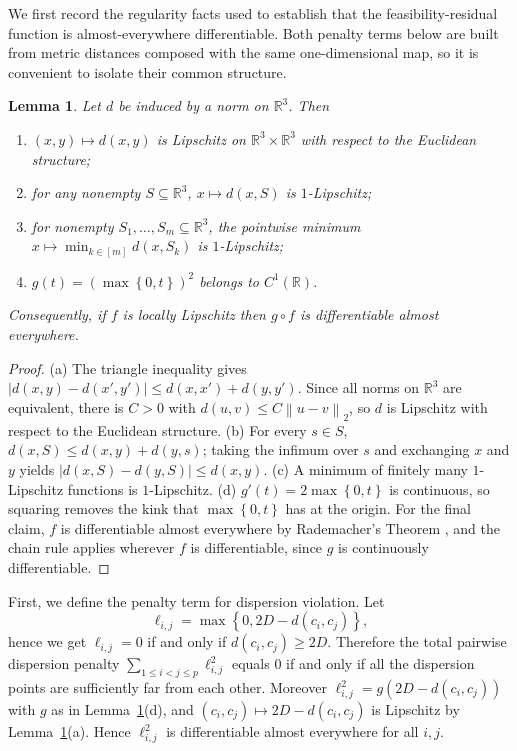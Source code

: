 \documentclass[preprint,12pt]{elsarticle}
\newtheorem{lemma}{Lemma}
\theoremstyle{remark}
\def \R {\mathbb{R}}
\newcommand{\set}[1]{\left\{ #1 \right\}}
\def \abs#1{\left| #1 \right|}
\def \norm#1{\left\|#1 \right\|}
\newcommand{\paren}[1]{\left( #1 \right)}
\begin{document}
We first record the regularity facts used to establish that the
feasibility-residual function is almost-everywhere differentiable. Both penalty
terms below are built from metric distances composed with the same
one-dimensional map, so it is convenient to isolate their common structure.

\begin{lemma}\label{lem:lipschitz}
  Let $d$ be induced by a norm on $\R^3$. Then
  \begin{enumerate}
    \item[(a)] $(x, y) \mapsto d(x, y)$ is Lipschitz on $\R^3 \times \R^3$ with
      respect to the Euclidean structure;
    \item[(b)] for any nonempty $S \subseteq \R^3$, $x \mapsto d(x, S)$ is
      $1$-Lipschitz;
    \item[(c)] for nonempty $S_1, \dots, S_m \subseteq \R^3$, the pointwise
      minimum $x \mapsto \min_{k \in [m]} d(x, S_k)$ is $1$-Lipschitz;
    \item[(d)] $g(t) = \paren{\max \set{0, t}}^2$ belongs to $C^1(\R)$.
  \end{enumerate}
  Consequently, if $f$ is locally Lipschitz then $g \circ f$ is differentiable
  almost everywhere.
\end{lemma}

\begin{proof}
  (a) The triangle inequality gives $\abs{d(x, y) - d(x', y')} \le d(x, x') +
  d(y, y')$. Since all norms on $\R^3$ are equivalent, there is $C > 0$ with
  $d(u, v) \le C \norm{u - v}_2$, so $d$ is Lipschitz with respect to the
  Euclidean structure. (b) For every $s \in S$, $d(x, S) \le d(x, y) + d(y, s)$;
  taking the infimum over $s$ and exchanging $x$ and $y$ yields $\abs{d(x, S) -
  d(y, S)} \le d(x, y)$. (c) A minimum of finitely many $1$-Lipschitz functions
  is $1$-Lipschitz. (d) $g'(t) = 2 \max \set{0, t}$ is continuous, so squaring
  removes the kink that $\max \set{0, t}$ has at the origin. For the final
  claim, $f$ is differentiable almost everywhere by Rademacher's Theorem
  \citep{evans2015}, and the chain rule applies wherever $f$ is differentiable,
  since $g$ is continuously differentiable.
\end{proof}

First, we define the penalty term for dispersion violation. Let
\begin{equation}
  \ell_{i, j} = \max \set{0, 2D - d(c_i, c_j)},
  \label{eq:lij}
\end{equation}
hence we get $\ell_{i, j} = 0$ if and only if $d(c_i, c_j) \ge 2D$. Therefore
the total pairwise dispersion penalty $\displaystyle{\sum_{1 \le i < j \le p}
\ell_{i, j}^2}$ equals $0$ if and only if all the dispersion points are
sufficiently far from each other. Moreover $\ell_{i, j}^2 = g \paren{2D - d(c_i,
c_j)}$ with $g$ as in Lemma~\ref{lem:lipschitz}(d), and $(c_i, c_j) \mapsto 2D -
d(c_i, c_j)$ is Lipschitz by Lemma~\ref{lem:lipschitz}(a). Hence $\ell_{i, j}^2$
is differentiable almost everywhere for all $i, j$.
\end{document}
